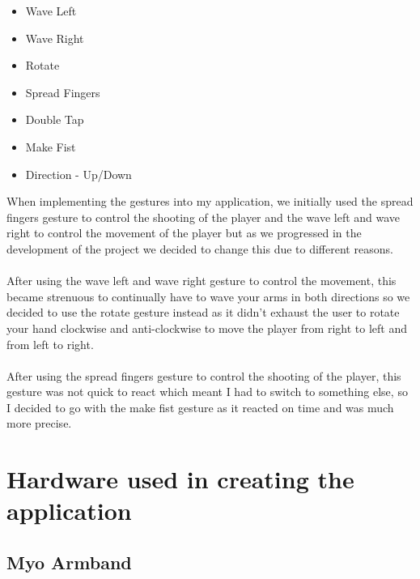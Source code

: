 \documentclass{article}
\begin{document}
\begin{itemize}
    \item Wave Left
    \item Wave Right
    \item Rotate
    \item Spread Fingers
    \item Double Tap
    \item Make Fist
    \item Direction - Up/Down
\end{itemize}
When implementing the gestures into my application, we initially used the spread fingers gesture to control the shooting of the player and the wave left and wave right to control the movement of the player but as we progressed in the development of the project we decided to change this due to different reasons.\\ \\
After using the wave left and wave right gesture to control the movement, this became strenuous to continually have to wave your arms in both directions so we decided to use the rotate gesture instead as it didn't exhaust the user to rotate your hand clockwise and anti-clockwise to move the player from right to left and from left to right.\\ \\
After using the spread fingers gesture to control the shooting of the player, this gesture was not quick to react which meant I had to switch to something else, so I decided to go with the make fist gesture as it reacted on time and was much more precise.

\section{Hardware used in creating the application}

\subsection{Myo Armband}
\end{document}
